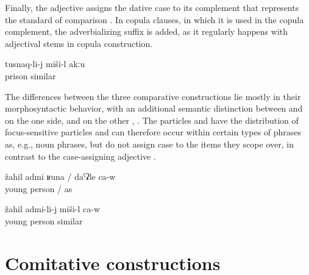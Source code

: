 Finally, the adjective   assigns the dative case to its complement that represents the standard of comparison . In copula clauses, in which it is used in the copula complement, the adverbializing suffix  is added, as it regularly happens with adjectival stems in copula construction.
%
\begin{exe}
	\ex	\label{ex:This is not similar to a prison}
	\gll	tusnaq-li-j	miši-l	akːu\\
		prison	similar	\\
	\glt	{}
\end{exe}

The differences between the three comparative constructions lie mostly in their morphosyntactic behavior, with an additional semantic distinction between  and  on the one side, and  on the other , . The particles  and  have the distribution of focus-sensitive particles and can therefore occur within certain types of phrases as, e.g., noun phrases, but do not assign case to the items they scope over, in contrast to the case-assigning adjective .
%
\begin{exe}
	\ex	\label{ex:‎‎‎(He) is like a young man. (i.e. He seems to be young, he looks young or behaves as if he were young)}
	\gll	žahil	admi	ʁuna	/	daˁʡle	ca-w\\
		young	person		/	as	\\
	\glt	{}

	\ex	\label{ex:‎‎‎(He) is similar to a young man}
	\gll	žahil	admi-li-j	miši-l	ca-w\\
		young	person	similar	\\
	\glt	{}
\end{exe}



\section{Comitative constructions}
\label{sec:Comitative constructions}

